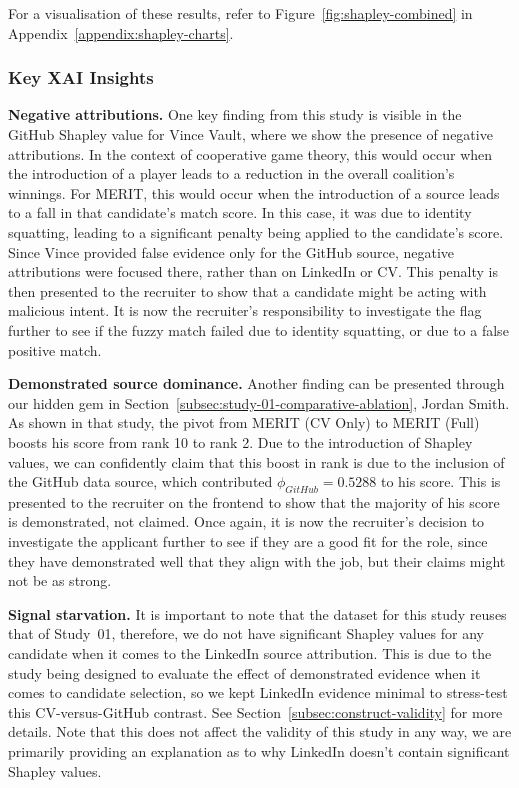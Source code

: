 For a visualisation of these results, refer to Figure~\ref{fig:shapley-combined} in 
Appendix~\ref{appendix:shapley-charts}.

\subsubsection{Key XAI Insights}

\textbf{Negative attributions.} One key finding from this study is visible in the GitHub Shapley value for Vince Vault, where we show the presence of negative attributions.
In the context of cooperative game theory, this would occur when the introduction of a player leads to a reduction in the overall coalition's
winnings. For MERIT, this would occur when the introduction of a source leads to a fall in that candidate's match score. In this case,
it was due to identity squatting, leading to a significant penalty being applied to the candidate's score.
Since Vince provided false evidence only for the GitHub source, negative attributions were focused there, rather than on LinkedIn or CV.
This penalty is then presented to the recruiter to show that a candidate might be acting with malicious intent.
It is now the recruiter's responsibility to investigate the flag further to see if the fuzzy match failed due to identity squatting, 
or due to a false positive match.

\textbf{Demonstrated source dominance.} Another finding can be presented through our hidden gem in Section~\ref{subsec:study-01-comparative-ablation},
Jordan Smith. As shown in that study, the pivot from MERIT (CV Only) to MERIT (Full) boosts his score from rank 10 to rank 2. Due
to the introduction of Shapley values, we can confidently claim that this boost in rank is due to the inclusion of the GitHub data source,
which contributed $\phi_{GitHub} = 0.5288$ to his score. This is presented to the recruiter on the frontend to show that the majority
of his score is demonstrated, not claimed. Once again, it is now the recruiter's decision to investigate the applicant further to
see if they are a good fit for the role, since they have demonstrated well that they align with the job, but their claims might not be as strong.

\textbf{Signal starvation.} It is important to note that the dataset for this study reuses that of Study~01, therefore, we do not have significant Shapley values for
any candidate when it comes to the LinkedIn source attribution. This is due to the study being designed to evaluate the effect of
demonstrated evidence when it comes to candidate selection, so we kept LinkedIn evidence minimal to stress-test this CV-versus-GitHub contrast.
See Section~\ref{subsec:construct-validity} for more details. Note that this does not affect
the validity of this study in any way, we are primarily providing an explanation as to why LinkedIn doesn't contain significant
Shapley values.

